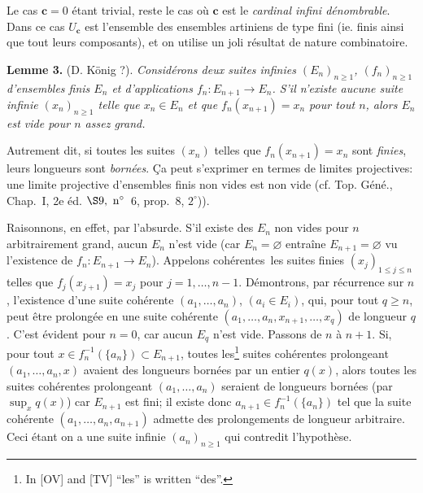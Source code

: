 \documentclass[12pt]{article}
\newcommand{\nn}{\noindent}
\begin{document}
Le cas $\mathbf c=0$ étant trivial, reste le cas où $\mathbf c$ est le \emph{cardinal infini dénombrable}. Dans ce cas $U_{\mathbf c}$ est l'ensemble des ensembles artiniens de type fini (ie. finis ainsi que tout leurs composants), et on utilise un joli résultat de nature combinatoire.

\nn\textbf{Lemme 3.} (D. König ?). \emph{Considérons deux suites infinies $(E_n)_{n\geq1}$, $(f_n)_{n \geq 1}$ d'ensembles finis $E_n$ et d'applications $f_n:E_{n+1} \rightarrow E_n$. S'il n'existe aucune suite infinie $(x_n)_{n\geq 1}$ telle que $x_n\in E_n$ et que $f_n(x_{n+1})=x_n$ pour tout $n$, alors $E_n$ est vide pour $n$ assez grand.}

Autrement dit, si toutes les suites $(x_n)$ telles que $f_n(x_{n+1})=x_n$ sont \emph{finies}, leurs longueurs sont \emph{bornées}. Ça peut s'exprimer en termes de limites projectives: une limite projective d'ensembles finis non vides est non vide (cf. Top. Géné., Chap.~I, 2e éd. $\S 9,\ \rm n^\circ$~6, prop.~8, $2^\circ$)).

Raisonnons, en effet, par l'absurde. S'il existe des $E_n$ non vides pour $n$ arbitrairement grand, aucun $E_n$ n'est vide (car $E_n=\varnothing$ entraîne $E_{n+1}=\varnothing$ vu l'existence de $f_n:E_{n+1}\rightarrow E_n$). Appelons \og cohérentes\fg\ les suites finies $(x_j)_{1\leq j\leq n}$ telles que $f_j(x_{j+1})=x_j$ pour $j=1,\ldots,n-1$. Démontrons, par récurrence sur $n$, l'existence d'une suite cohérente $(a_1,\ldots,a_n)$, $(a_i\in E_i)$, qui, pour tout $q\geq n$, peut être prolongée en une suite cohérente $(a_1,\ldots,a_n,x_{n+1},\ldots,x_q)$ de longueur $q$. C'est évident pour $n=0$, car aucun $E_q$ n'est vide. Passons de $n$ à $n+1$. Si, pour tout $x\in f^{-1}_n(\{a_n\}) \subset E_{n+1}$, toutes les\footnote{In [OV] and [TV] ``les'' is written ``des''.} suites cohérentes prolongeant $(a_1,\ldots,a_n,x)$ avaient des longueurs bornées par un entier $q(x)$, alors toutes les suites cohérentes prolongeant $(a_1,\ldots,a_n)$ seraient de longueurs bornées (par $\sup_x q(x)$) car $E_{n+1}$ est fini; il existe donc $a_{n+1} \in f^{-1}_n(\{a_n\})$ tel que la suite cohérente $(a_1, \ldots, a_n, a_{n+1})$ admette des prolongements de longueur arbitraire. Ceci étant on a une suite infinie $(a_n)_{n\geq 1}$ qui contredit l'hypothèse.
\end{document}
